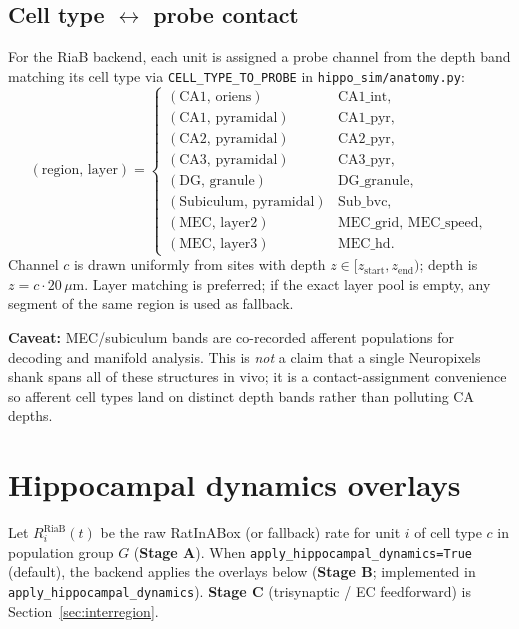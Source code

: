 \documentclass[11pt,a4paper]{article}
\begin{document}
\subsection{Cell type $\leftrightarrow$ probe contact}
For the RiaB backend, each unit is assigned a probe channel from the depth band matching its cell type via \texttt{CELL\_TYPE\_TO\_PROBE} in \texttt{hippo\_sim/anatomy.py}:
\begin{equation}
  (\mathrm{region},\,\mathrm{layer})
  =
  \begin{cases}
    (\mathrm{CA1},\,\mathrm{oriens}) & \mathrm{CA1\_int}, \\
    (\mathrm{CA1},\,\mathrm{pyramidal}) & \mathrm{CA1\_pyr}, \\
    (\mathrm{CA2},\,\mathrm{pyramidal}) & \mathrm{CA2\_pyr}, \\
    (\mathrm{CA3},\,\mathrm{pyramidal}) & \mathrm{CA3\_pyr}, \\
    (\mathrm{DG},\,\mathrm{granule}) & \mathrm{DG\_granule}, \\
    (\mathrm{Subiculum},\,\mathrm{pyramidal}) & \mathrm{Sub\_bvc}, \\
    (\mathrm{MEC},\,\mathrm{layer2}) & \mathrm{MEC\_grid},\,\mathrm{MEC\_speed}, \\
    (\mathrm{MEC},\,\mathrm{layer3}) & \mathrm{MEC\_hd}.
  \end{cases}
  \label{eq:probe-contact}
\end{equation}
Channel $c$ is drawn uniformly from sites with depth $z\in[z_{\mathrm{start}},z_{\mathrm{end}})$; depth is $z=c\cdot 20\,\mu\mathrm{m}$.
Layer matching is preferred; if the exact layer pool is empty, any segment of the same region is used as fallback.

\textbf{Caveat:} MEC/subiculum bands are co-recorded afferent populations for decoding and manifold analysis.
This is \emph{not} a claim that a single Neuropixels shank spans all of these structures in vivo; it is a contact-assignment convenience so afferent cell types land on distinct depth bands rather than polluting CA depths.

\section{Hippocampal dynamics overlays}
\label{sec:dynamics}

Let $R^{\mathrm{RiaB}}_{i}(t)$ be the raw RatInABox (or fallback) rate for unit $i$ of cell type $c$ in population group $G$ (\textbf{Stage A}).
When \texttt{apply\_hippocampal\_dynamics=True} (default), the backend applies the overlays below (\textbf{Stage B}; implemented in \texttt{apply\_hippocampal\_dynamics}).
\textbf{Stage C} (trisynaptic / EC feedforward) is Section~\ref{sec:interregion}.
\end{document}
